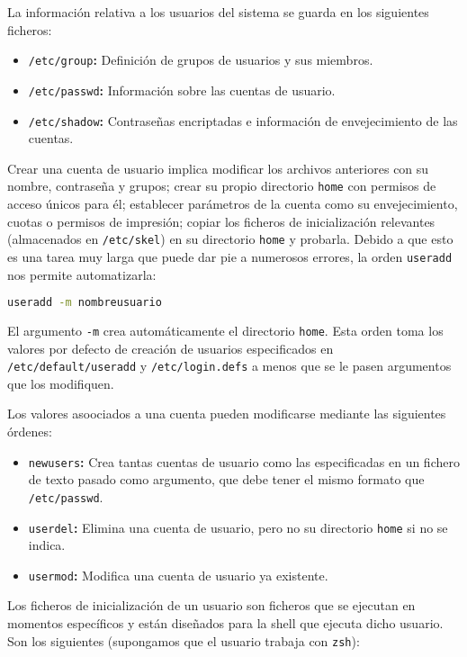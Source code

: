 La información relativa a los usuarios del sistema se guarda en los siguientes ficheros:

\begin{itemize}
	\item\texttt{/etc/group}\textbf{:} Definición de grupos de usuarios y sus miembros.
	\item\texttt{/etc/passwd}\textbf{:} Información sobre las cuentas de usuario.
	\item\texttt{/etc/shadow}\textbf{:} Contraseñas encriptadas e información de envejecimiento de las cuentas.
\end{itemize}

Crear una cuenta de usuario implica modificar los archivos anteriores con su nombre, contraseña y grupos; crear su propio directorio \texttt{home} con permisos de acceso únicos para él; establecer parámetros de la cuenta como su envejecimiento, cuotas o permisos de impresión; copiar los ficheros de inicialización relevantes (almacenados en \texttt{/etc/skel}) en su directorio \texttt{home} y probarla.
Debido a que esto es una tarea muy larga que puede dar pie a numerosos errores, la orden \texttt{useradd} nos permite automatizarla:

\begin{lstlisting}[language=Bash]
useradd -m nombreusuario
\end{lstlisting}

El argumento \texttt{-m} crea automáticamente el directorio \texttt{home}.
Esta orden toma los valores por defecto de creación de usuarios especificados en \texttt{/etc/default/useradd} y \texttt{/etc/login.defs} a menos que se le pasen argumentos que los modifiquen.

Los valores asoociados a una cuenta pueden modificarse mediante las siguientes órdenes:

\begin{itemize}
	\item\texttt{newusers}\textbf{:} Crea tantas cuentas de usuario como las especificadas en un fichero de texto pasado como argumento, que debe tener el mismo formato que \texttt{/etc/passwd}.
	\item\texttt{userdel}\textbf{:} Elimina una cuenta de usuario, pero no su directorio \texttt{home} si no se indica.
	\item\texttt{usermod}\textbf{:} Modifica una cuenta de usuario ya existente.
\end{itemize}

Los ficheros de inicialización de un usuario son ficheros que se ejecutan en momentos específicos y están diseñados para la shell que ejecuta dicho usuario.
Son los siguientes (supongamos que el usuario trabaja con \texttt{zsh}):

